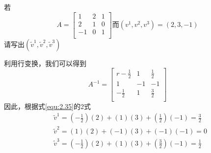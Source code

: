 \begin{example}
    若
    \begin{equation*}
        A=\left[ \begin{matrix}
            1&		2&		1\\
            2&		1&		0\\
            -1&		0&		1\\
        \end{matrix} \right] \text{而}\left( v^1,v^2,v^3 \right) =\left( 2,3,-1 \right) 
    \end{equation*}
    请写出$\left( \tilde{v}^1,\tilde{v}^2,\tilde{v}^3 \right) $
\end{example}
\begin{solution}
    利用行变换，我们可以得到
    \begin{equation*}
        A^{-1}=\left[ \begin{matrix}{r}
            -\frac{1}{2}&		1&		\frac{1}{2}\\
            1&		-1&		-1\\
            -\frac{1}{2}&		1&		\frac{3}{2}\\
        \end{matrix} \right] 
    \end{equation*}
    因此，根据式\eqref{equ:2.35}的2式
    \begin{align*}
        &\tilde{v}^1=\left( -\frac{1}{2} \right) (2)+(1)(3)+\left( \frac{1}{2} \right) (-1)=\frac{3}{2}\\
        &\tilde{v}^2=(1)(2)+(-1)(3)+(-1)(-1)=0\\
        &\tilde{v}^3=\left( -\frac{1}{2} \right) (2)+(1)(3)+\left( \frac{3}{2} \right) (-1)=\frac{1}{2}
    \end{align*}
\end{solution}

